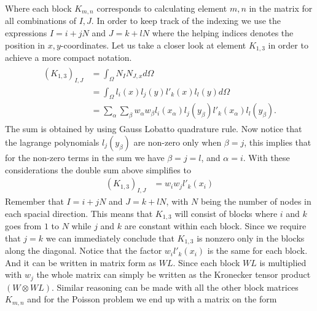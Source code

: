 Where each block $K_{m,n}$ corresponds to  calculating element $m,n$ in the matrix for all combinations of $I,J$. In order to keep track of the indexing we use the expressions $I = i+jN$ and $J = k+lN$ where the helping indices denotes the position in $x,y$-coordinates. Let us take a closer look at element $K_{1,3}$ in order to achieve a more compact notation. 
\begin{align}
	\begin{split}
	(K_{1,3})_{I,J} &= \int_{\Omega} N_I N_{J,x} d\Omega \\
	&= \int_{\Omega} l_i(x)l_j(y)l'_k(x)l_l(y) d\Omega \\
	&= \sum_{\alpha}\sum_{\beta} w_{\alpha}w_{\beta}l_i(x_{\alpha})l_j(y_{\beta})l'_k(x_{\alpha})l_l(y_{\beta}).
	\end{split}
	\label{eq:MatrixDerivation}
\end{align}
The sum is obtained by using Gauss Lobatto quadrature rule. Now notice that the lagrange polynomials $l_j(y_{\beta})$ are non-zero only when $\beta = j$, this implies that for the non-zero terms in the sum we have $\beta = j=l$, and $\alpha = i$. With these considerations the double sum above simplifies to  
\begin{align}
	(K_{1,3})_{I,J} &= w_{i}w_{j}l'_k(x_{i})
	\label{eq:MatrixDerivation2}
\end{align}
Remember that $I = i+jN$ and $J = k+lN$, with $N$ being the number of nodes in each spacial direction. This means that $K_{1,3}$ will consist of blocks where $i$ and $k$ goes from $1$ to $N$ while $j$ and $k$ are constant within each block. Since we require that $j=k$ we can immediately conclude that $K_{1,3}$ is nonzero only in the blocks along the diagonal. Notice that the factor $w_il'_k(x_i)$ is the same for each block. And it can be written in matrix form as $WL$. Since each block $WL$ is multiplied with $w_j$ the whole matrix can simply be written as the Kronecker tensor product $(W\otimes WL)$. Similar reasoning can be made with all the other block matrices $K_{m,n}$ and for the Poisson problem we end up with a matrix on the form

